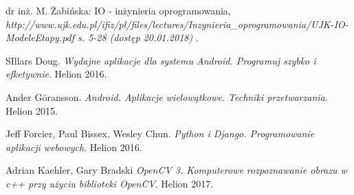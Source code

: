 \newpage
   \begin{thebibliography}{99}
   
    	dr inż. M. Żabińska: IO - inżynieria oprogramowania,
    	\\\textit{http://www.ujk.edu.pl/ifiz/pl/files/lectures/Inzynieria\_oprogramowania/UJK-IO-ModeleEtapy.pdf s. 5-28 (dostęp 20.01.2018)}
		.
		
    	SIllars Doug.
    	\textit{Wydajne aplikacje dla systemu Android. Programuj szybko i efketywnie}. 
    	Helion 2016.
    	
    	
    	Ander Göransson. 
    	\textit{Android. Aplikacje wielowątkowe. Techniki przetwarzania}. 
    	Helion 2015.
    	
    	
    	Jeff Forcier, Paul Bissex, Wesley Chun.
    	\textit{Python i Django. Programowanie aplikacji webowych}. 
    	Helion 2016.
    	
    	
    	Adrian Kaehler, Gary Bradski 
    	\textit{OpenCV 3. Komputerowe rozpoznawanie obrazu w c++ przy użyciu biblioteki OpenCV}. 
    	Helion 2017.
   
	 \end{thebibliography}
 
